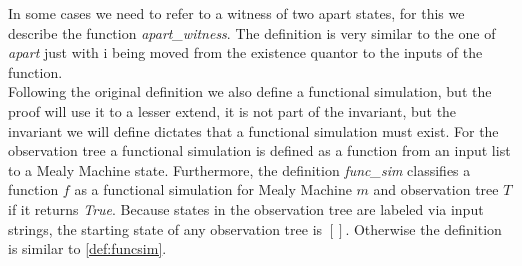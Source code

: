 In some cases we need to refer to a witness of two apart states, for this we describe the function \textit{apart\_witness}. The definition is very similar to the one of \textit{apart} just with i being moved from the existence quantor to the inputs of the function.\\
Following the original definition we also define a functional simulation, but the proof will use it to a lesser extend, it is not part of the invariant, but the invariant we will define dictates that a functional simulation must exist. For the observation tree a functional simulation is defined as a function from an input list to a Mealy Machine state. Furthermore, the definition \textit{func\_sim} classifies a function $f$ as a functional simulation for Mealy Machine $m$ and observation tree $T$ if it returns \textit{True}. Because states in the observation tree are labeled via input strings, the starting state of any observation tree is $[]$. Otherwise the definition is similar to \autoref{def:funcsim}. 
\begin{myisabelle}
	\funcsim
\end{myisabelle}
